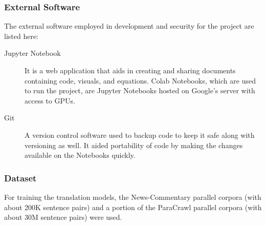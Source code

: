 \documentclass[12pt,a4paper,twoside,openright]{report}
\begin{document}
\subsubsection{External Software}
The external software employed in development and security for the project are listed here:
\begin{description}

\item[Jupyter Notebook]
It is a web application that aids in creating and sharing documents containing code, visuals, and equations. Colab Notebooks, which are used to run the project, are Jupyter Notebooks hosted on Google's server with access to GPUs.

\item[Git]
A version control software used to backup code to keep it safe along with versioning as well. It aided portability of code by making the changes available on the Notebooks quickly.



\end{description}


\subsubsection{Dataset}

For training the translation models, the News-Commentary\cite{news-commentary} parallel corpora (with about 200K sentence pairs) and a portion of the ParaCrawl\cite{paracrawl} parallel corpora (with about 30M sentence pairs) were used.
\end{document}

